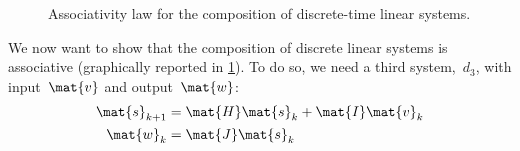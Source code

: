 \begin{figure}[h]
  \centering
  \begin{center}
    {
    }
  \end{center}
  \caption{Associativity law for the composition of discrete-time linear systems. \label{fig:ass_dyn_syst}}
\end{figure}

We now want to show that the composition of discrete linear systems is associative (graphically reported in \cref{fig:ass_dyn_syst}). To do so, we need a third system,~$d_3$, with input~$\mat{v}$ and output~$\mat{w}$:
\begin{equation*}
  \label{eq:dlin-4}
  \begin{aligned}
    \mat{s}_{k+1} &= \mat{H} \mat{s}_k + \mat{I} \mat{v}_k \\
    \mat{w}_{k}   &= \mat{J} \mat{s}_k
  \end{aligned}
\end{equation*}

